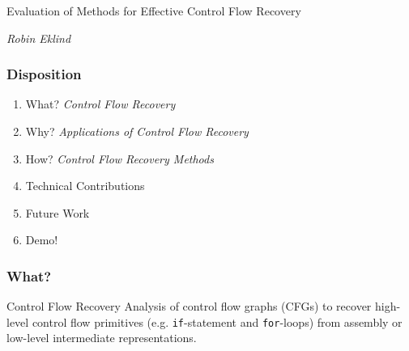 \documentclass[aspectratio=1610]{beamer}
\begin{document}

\startpage

\begin{frame}
	\vspace{0.02\textheight}

	\begin{Large}
		Evaluation of Methods for Effective Control Flow Recovery
	\end{Large}

	\vspace{0.1\textheight}

	\begin{small}
		\textit{Robin Eklind}
	\end{small}
\end{frame}


\normalpage

\begin{frame}
	\frametitle{Disposition}

	\begin{enumerate}
		\item What? \textit{Control Flow Recovery}
		\item Why? \textit{Applications of Control Flow Recovery}
		\item How? \textit{Control Flow Recovery Methods}
		\item Technical Contributions
		\item Future Work
		\item Demo!
	\end{enumerate}
\end{frame}







\begin{frame}
	\frametitle{What?}

	\begin{block}{Control Flow Recovery}
		Analysis of control flow graphs (CFGs) to recover high-level control flow primitives (e.g. \texttt{if}-statement and \texttt{for}-loops) from assembly or low-level intermediate representations.
	\end{block}
\end{frame}
\end{document}

